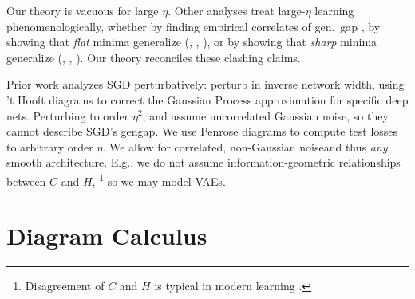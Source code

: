 \documentclass{article}
\theoremstyle{plain}
\theoremstyle{definition}
\begin{document}

    Our theory is vacuous for large $\eta$.  Other analyses treat
    large-$\eta$ learning phenomenologically, whether by finding empirical
    correlates of gen.\ gap \citep{li18}, by showing that \emph{flat} minima
    generalize (\cite{ho17}, \cite{ke17}, \cite{wa18}), or by showing that
    \emph{sharp} minima generalize (\cite{st56}, \cite{di17}, \cite{wu18}).
    Our theory reconciles these clashing claims.
    

    Prior work analyzes SGD perturbatively: \cite{dy19} perturb in inverse
    network width, using 't Hooft diagrams to correct the Gaussian Process
    approximation for specific deep nets.  Perturbing to order $\eta^2$,
    \cite{ch18} and \cite{li17} assume uncorrelated Gaussian noise, so they
    cannot describe SGD's gen\. gap.  We use Penrose diagrams to compute test
    losses to arbitrary order $\eta$.  We allow for correlated, non-Gaussian
    noiseand thus \emph{any} smooth architecture.  E.g., we do not assume
    information-geometric relationships between $C$ and
    $H$,
    \footnote{
        Disagreement of $C$ and $H$ is typical in modern learning \citep{ro12,
        ku19}.
    }
    so we may model VAEs. 




\section{Diagram Calculus} \label{sect:calculus}

               
\end{document}
